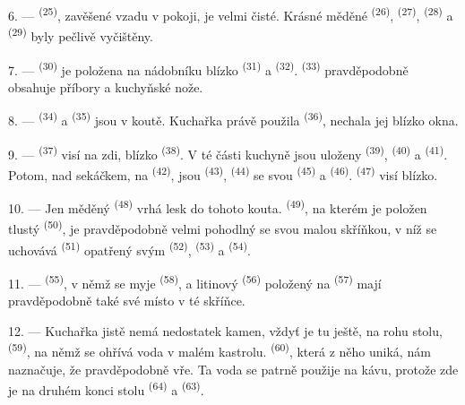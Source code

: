 6. ---  \textsuperscript{(25)}, zavěšené vzadu v pokoji, je velmi
čisté. Krásné měděné  \textsuperscript{(26)}, 
\textsuperscript{(27)},  \textsuperscript{(28)} a
 \textsuperscript{(29)} byly pečlivě vyčištěny.

7. ---  \textsuperscript{(30)} je položena na nádobníku blízko
 \textsuperscript{(31)} a 
\textsuperscript{(32)}.  \textsuperscript{(33)} pravděpodobně obsahuje příbory
a kuchyňské nože.

8. ---  \textsuperscript{(34)} a  \textsuperscript{(35)} jsou
v koutě. Kuchařka právě použila  \textsuperscript{(36)}, nechala jej
blízko okna.

9. ---  \textsuperscript{(37)} visí na zdi, blízko 
\textsuperscript{(38)}. V té části kuchyně jsou uloženy  \textsuperscript{(39)},
 \textsuperscript{(40)} a  \textsuperscript{(41)}.
Potom, nad sekáčkem, na  \textsuperscript{(42)}, jsou 
\textsuperscript{(43)},  \textsuperscript{(44)} se svou
 \textsuperscript{(45)} a
 \textsuperscript{(46)}.  \textsuperscript{(47)} visí
blízko.

10. --- Jen měděný  \textsuperscript{(48)} vrhá lesk do tohoto kouta.
 \textsuperscript{(49)}, na kterém je položen tlustý 
\textsuperscript{(50)}, je pravděpodobně velmi pohodlný se svou malou skříňkou, v níž se
uchovává  \textsuperscript{(51)} opatřený svým
 \textsuperscript{(52)}, 
\textsuperscript{(53)} a  \textsuperscript{(54)}.

\VUsaut{4.0mm}
\VUsaut{3.0mm}

11. ---  \textsuperscript{(55)}, v němž se myje 
\textsuperscript{(58)}, a litinový  \textsuperscript{(56)} položený na
 \textsuperscript{(57)} mají pravděpodobně také své místo v
té skříňce.

12. --- Kuchařka jistě nemá nedostatek kamen, vždyť je tu ještě, na rohu stolu,
 \textsuperscript{(59)}, na němž se ohřívá voda v malém kastrolu.
 \textsuperscript{(60)}, která z něho uniká, nám naznačuje, že
pravděpodobně vře. Ta voda se patrně použije na kávu, protože zde je na druhém konci stolu
 \textsuperscript{(64)} a 
\textsuperscript{(63)}.

